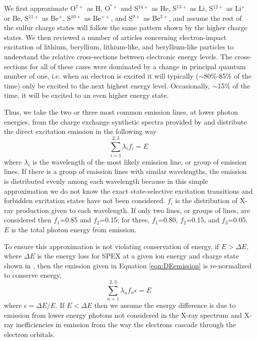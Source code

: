 \documentclass[draft]{agujournal2018}
\begin{document}
We first approximate O$^{7+}$ as H, O$^{^6+}$ and S$^{14+}$ as He, S$^{13+}$ as Li, S$^{12+}$ as Li$^{+}$ or Be, S$^{11+}$ as Be$^{+}$, S$^{10+}$ as Be$^{++}$, and S$^{9+}$ as Be$^{3+}$, and assume the rest of the sulfur charge states will follow the same pattern shown by the higher charge states.
We then reviewed a number of articles concerning electron-impact excitation of lithium\citep{griffin2001}, beryllium\citep{bartschat1996}, lithium-like\citep{bely1966}, and beryllium-like\citep{bartschat1996} particles to understand the relative cross-sections between electronic energy levels.
The cross-sections for all of these cases were dominated by a change in principal quantum number of one, i.e. when an electron is excited it will typically ($\sim$80$\%$-85$\%$ of the time) only be excited to the next highest energy level.
Occasionally, $\sim$15$\%$ of the time, it will be excited to an even higher energy state.

Thus, we take the two or three most common emission lines, at lower photon energies, from the charge exchange synthetic spectra provided by \citet{hui2010} and distribute the direct excitation emission in the following way
\begin{equation}
    \sum_{i=1}^{2,3}\lambda_{i}f_{i}=E
    \label{eqn:DEemission}
\end{equation}
where $\lambda_{i}$ is the wavelength of the most likely emission line, or group of emission lines.
If there is a group of emission lines with similar wavelengths, the emission is distributed evenly among each wavelength because in this simple approximation we do not know the exact state-selective excitation transitions and forbidden excitation states have not been considered.
$f_{i}$ is the distribution of X-ray production given to each wavelength.
If only two lines, or groups of lines, are considered then $f_{1}$=0.85 and $f_{2}$=0.15; for three, $f_{1}$=0.80, $f_{2}$=0.15, and $f_{3}$=0.05.
$E$ is the total photon energy from emission.

To ensure this approximation is not violating conservation of energy, if $E>\Delta E$, where $\Delta E$ is the energy loss for SPEX at a given ion energy and charge state shown in \citet{schultz2018}, then the emission given in Equation \ref{eqn:DEemission} is re-normalized to conserve energy,
\begin{equation}
    \sum_{n=1}^{2,3}\lambda_{n}f_{n}\epsilon=E
\end{equation}
where $\epsilon=\Delta E/E$.
If $E<\Delta E$ then we assume the energy difference is due to emission from lower energy photons not considered in the X-ray spectrum and X-ray inefficiencies in emission from the way the electrons cascade through the electron orbitals.
\end{document}
